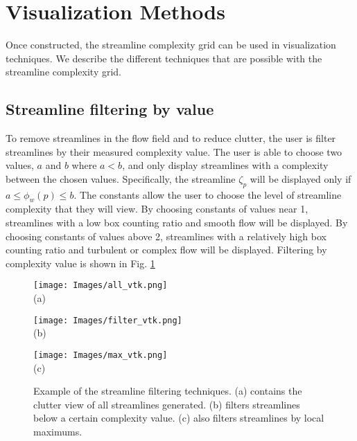 \documentclass{egpubl}
\begin{document}
\section{Visualization Methods}

Once constructed, the streamline complexity grid can be used in visualization techniques.
We describe the different techniques that are possible with the streamline complexity grid.

\subsection{Streamline filtering by value}
To remove streamlines in the flow field and to reduce clutter, the user is filter streamlines by their measured complexity value.
The user is able to choose two values, $a$ and $b$ where $a < b$, and only display streamlines with a complexity between the chosen values. 
Specifically, the streamline $\zeta_p$ will be displayed only if $a \leq \phi_w(p) \leq b$.
The constants allow the user to choose the level of streamline complexity that they will view.
By choosing constants of values near 1, streamlines with a low box counting ratio and smooth flow will be displayed.
By choosing constants of values above 2, streamlines with a relatively high box counting ratio and turbulent or complex flow will be displayed.
Filtering by complexity value is shown in Fig. \ref{fig:value_filter}

\begin{figure}[h]
        \centering
                \begin{minipage}{0.30\linewidth}
                        \small \centering
                       	\texttt{[image: Images/all\_vtk.png]}\\(a)
                \end{minipage}
                \begin{minipage}{0.30\linewidth}
                        \small \centering
                        \texttt{[image: Images/filter\_vtk.png]}\\(b)
                \end{minipage}
                \begin{minipage}{0.30\linewidth}
                        \small \centering
                        \texttt{[image: Images/max\_vtk.png]}\\(c)
                \end{minipage}
        \caption{Example of the streamline filtering techniques. (a) contains the clutter view of all streamlines generated. (b) filters streamlines below a certain complexity value. (c) also filters streamlines by local maximums.}
        \label{fig:value_filter}
\end{figure}
\end{document}
